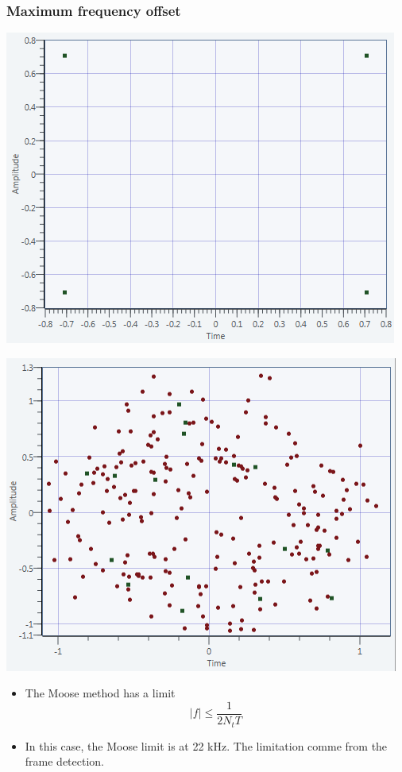 \documentclass[11pt]{beamer}
\begin{document}
\begin{frame}
\frametitle{Maximum frequency offset}
\begin{minipage}[b]{0.48\linewidth}
        \centering \includegraphics[scale=0.35]{img/Moose_Limit_10k.png}
    \end{minipage}\hfill
    \begin{minipage}[b]{0.48\linewidth}
         \centering \includegraphics[scale=0.35]{img/Moose_Limit_12k.png}
    \end{minipage}
\begin{itemize}
\item The Moose method has a limit 
\begin{equation}
|f| \leq \frac{1}{2N_tT}
\end{equation}
\item In this case, the Moose limit is at 22 kHz. The limitation comme from the frame detection.
\end{itemize}
\end{frame}
\end{document}
